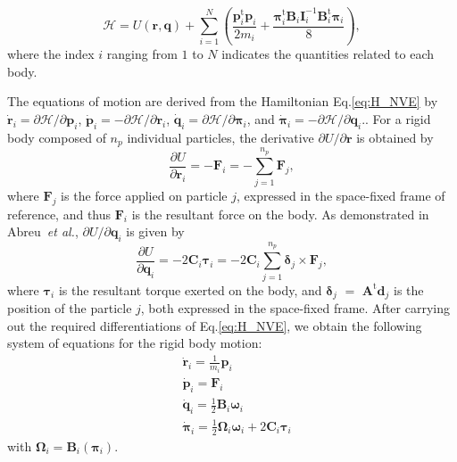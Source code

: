 \documentclass[aip,jcp,reprint,amsmath,amssymb]{revtex4-1}
\newcommand{\mt}[1]{\boldsymbol{\mathbf{#1}}}           %
\newcommand{\vt}[1]{\boldsymbol{\mathbf{#1}}}           %
\newcommand{\tr}[1]{#1^\text{t}}                        %
\newcommand{\diff}[2]{\dfrac{\partial #1}{\partial #2}} %
\begin{document}
\begin{equation}
\label{eq:H_NVE}
\mathcal{H} = U(\vt r,\vt q) + \sum_{i=1}^N \left(\frac{\tr{\vt p}_i{\vt p}_i}{2m_i} + \frac{\tr{\vt \pi}_i {\mt B}_i {\mt I}_i^{-1} \tr{\mt B}_i {\vt \pi}_i}{8}\right),
\end{equation}
where the index $i$ ranging from $1$ to $N$ indicates the quantities related to each body.

The equations of motion are derived from the Hamiltonian Eq.\eqref{eq:H_NVE} by $\dot{\vt r}_i = \partial \mathcal{H} / \partial \vt p_i$, $\dot{\vt p}_i = -\partial \mathcal{H} / \partial \vt r_i$, $\dot{\vt q}_i = \partial \mathcal{H} / \partial \vt \pi_i$, and $\dot{\vt \pi}_i = -\partial \mathcal{H} / \partial \vt q_i$.\cite{Goldstein2002}. For a rigid body composed of $n_p$ individual particles, the derivative $\partial U/\partial \vt r$ is obtained by
\[
\diff{U}{\vt r_i} = -\vt F_i = -\sum_{j=1}^{n_p} {\vt F_j},
\]
where $\vt F_j$ is the force applied on particle $j$, expressed in the space-fixed frame of reference, and thus $\vt F_i$ is the resultant force on the body. As demonstrated in Abreu~\textit{et al.},\citep{Abreu_2017} $\partial{U}/\partial \vt q_i$ is given by
\[
\diff{U}{\vt q_i} = -2 \mt C_i \vt \tau_i = -2 \mt C_i \sum_{j=1}^{n_p} {\vt \delta_j} \times {\vt F_j},
\]
where $\vt \tau_i$ is the resultant torque exerted on the body, and ${\vt \delta}_j$ $=$ $\tr{\mt A} {\vt d}_j$ is the position of the particle $j$, both expressed in the space-fixed frame. After carrying out the required differentiations of Eq.\eqref{eq:H_NVE}, we obtain the following system of equations for the rigid body motion:
\begin{subequations}
\label{eq:EDO_system}
\begin{align}
&\dot{\vt r}_i = \frac{1}{m_i} \vt p_i \\
&\dot{\vt p}_i = \mt F_i \\
&\dot{\vt q}_i = \frac{1}{2} \mt B_i \vt \omega_i \label{eq:EDO_q} \\
&\dot{\vt \pi}_i = \frac{1}{2} \mt \Omega_i \vt \omega_i + 2 \mt C_i \vt \tau_i \label{eq:EDO_pi}
\end{align}
\end{subequations}
with $\mt \Omega_i = \mt B_i(\vt \pi_i)$.
\end{document}

